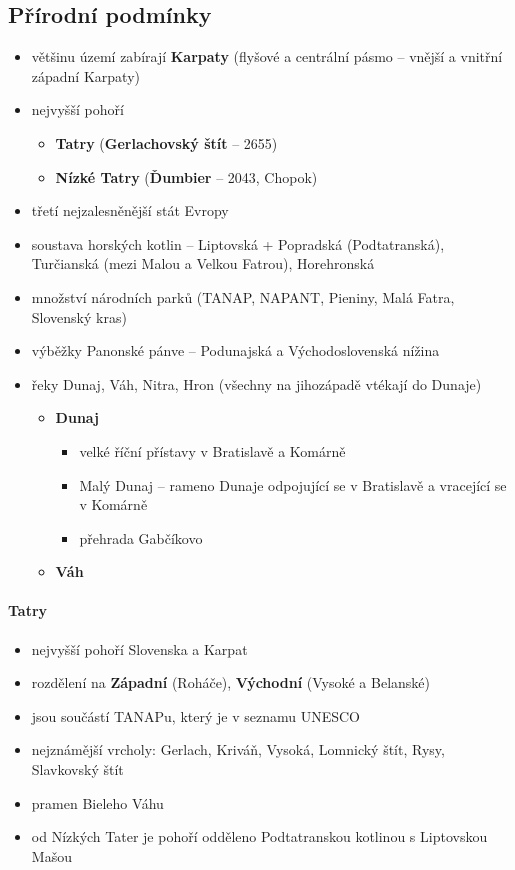\documentclass[10pt,a4paper]{article}
\begin{document}
\subsection{Přírodní podmínky}
\begin{itemize}
\item většinu území zabírají \textbf{Karpaty} (flyšové a centrální pásmo -- vnější a vnitřní západní Karpaty)
\item nejvyšší pohoří
\begin{itemize}
\item \textbf{Tatry} (\textbf{Gerlachovský štít} -- 2655)
\item \textbf{Nízké Tatry} (\textbf{Ďumbier} -- 2043, Chopok)
\end{itemize}
\item třetí nejzalesněnější stát Evropy
\item soustava horských kotlin -- Liptovská + Popradská (Podtatranská), Turčianská (mezi Malou a Velkou Fatrou), Horehronská
\item množství národních parků (TANAP, NAPANT, Pieniny, Malá Fatra, Slovenský kras)
\item výběžky Panonské pánve -- Podunajská a Východoslovenská nížina
\item řeky Dunaj, Váh, Nitra, Hron (všechny na jihozápadě vtékají do Dunaje)
\begin{itemize}
\item \textbf{Dunaj}
\begin{itemize}
\item velké říční přístavy v Bratislavě a Komárně
\item Malý Dunaj -- rameno Dunaje odpojující se v Bratislavě a vracející se v Komárně
\item přehrada Gabčíkovo
\end{itemize}
\item \textbf{Váh}
\end{itemize}
\end{itemize}


\paragraph{Tatry}
\begin{itemize}
\item nejvyšší pohoří Slovenska a Karpat
\item rozdělení na \textbf{Západní} (Roháče), \textbf{Východní} (Vysoké a Belanské)
\item jsou součástí TANAPu, který je v seznamu UNESCO
\item nejznámější vrcholy: Gerlach, Kriváň, Vysoká, Lomnický štít, Rysy, Slavkovský štít
\item pramen Bieleho Váhu
\item od Nízkých Tater je pohoří odděleno Podtatranskou kotlinou s Liptovskou Mašou
\end{itemize}
\end{document}
